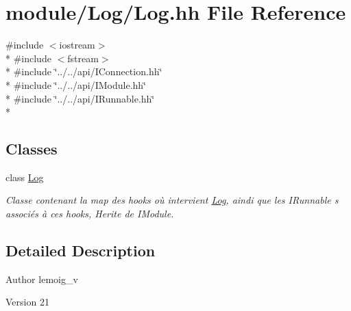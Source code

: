 \hypertarget{_log_8hh}{}\section{module/\+Log/\+Log.hh File Reference}
\label{_log_8hh}
{\ttfamily \#include $<$iostream$>$}\\*
{\ttfamily \#include $<$fstream$>$}\\*
{\ttfamily \#include \char`\"{}../../api/\+I\+Connection.\+hh\char`\"{}}\\*
{\ttfamily \#include \char`\"{}../../api/\+I\+Module.\+hh\char`\"{}}\\*
{\ttfamily \#include \char`\"{}../../api/\+I\+Runnable.\+hh\char`\"{}}\\*
\subsection*{Classes}
\begin{DoxyCompactItemize}
\item 
class \hyperlink{class_log}{Log}
\begin{DoxyCompactList}\small\item\em Classe contenant la map des hooks où intervient \hyperlink{class_log}{Log}, aindi que les I\+Runnable s associés à ces hooks, Herite de I\+Module. \end{DoxyCompactList}\end{DoxyCompactItemize}


\subsection{Detailed Description}
\begin{DoxyAuthor}{Author}
lemoig\+\_\+v 
\end{DoxyAuthor}
\begin{DoxyVersion}{Version}
21 
\end{DoxyVersion}
